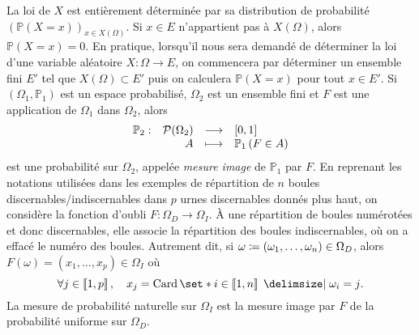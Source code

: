 \documentclass{magnolia}
\begin{document}
\begin{remarques}
\remarque La loi de $X$ est entièrement déterminée par
  sa distribution de probabilité $(\mathbb{P}(X=x))_{x\in X(\Omega)}$.
\remarque Si $x\in E$ n'appartient pas à $X(\Omega)$, alors $\mathbb{P}(X=x)=0$.
\remarque En pratique, lorsqu'il nous sera demandé de déterminer la loi d'une variable aléatoire
  $X:\Omega\to E$, on commencera par déterminer un ensemble fini $E'$ tel que $X(\Omega)\subset E'$
  puis on calculera $\mathbb{P}(X=x)$ pour tout $x\in E'$.
\remarque Si $(\Omega_1,\mathbb{P}_1)$ est un espace probabilisé, $\Omega_2$ est un ensemble fini et
  $F$ est une application de $\Omega_1$ dans $\Omega_2$, alors
  \[\begin{array}[t]{lrcl} \displaystyle{\mathbb{P}_2} : & \displaystyle{\mathcal{P}(\Omega_2)} & \longrightarrow & \displaystyle{\left[0,1\right]} \\ & \displaystyle{A} & \longmapsto & \displaystyle{\mathbb{P}_1\left(F\in A\right)} \end{array}\] 
  est une probabilité sur $\Omega_2$, appelée \emph{mesure image} de $\mathbb{P}_1$ par $F$. 
  En reprenant les notations utilisées dans les exemples de répartition de $n$ boules  
  discernables/indiscernables
  dans $p$ urnes discernables donnés plus haut, 
  on considère la fonction d'oubli $F:\Omega_D\to\Omega_I$. À une répartition de boules numérotées et donc discernables, elle associe
  la répartition
  des boules indiscernables, où on a effacé le numéro des boules. Autrement dit, si
  $\omega\coloneqq(\omega_1,\ldots,\omega_n)\in\Omega_D$, alors
  $F(\omega)=(x_1,\ldots,x_p)\in\Omega_I$ où
  \[\forall j\in\intere{1}{p}\qsep x_j=\card\enstq{i\in\intere{1}{n}}{\omega_i=j}.\]
  La mesure de probabilité naturelle sur $\Omega_I$ est la mesure image par $F$ de la probabilité uniforme sur
  $\Omega_D$.
\end{remarques}
\end{document}
